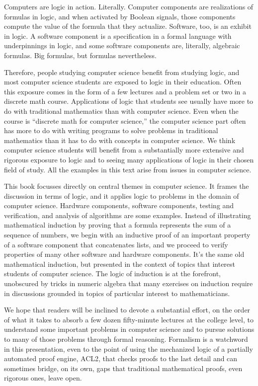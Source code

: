 \begin{preface}
Computers are logic in action. Literally.
Computer components are realizations of formulas in logic,
and when activated by Boolean signals, those components
compute the value of the formula that they actualize.
Software, too, is an exhibit in logic.
A software component is a specification in a formal language
with underpinnings in logic,
and some software components
are, literally, algebraic formulas.
Big formulas, but formulas nevertheless.

Therefore, people studying computer science
benefit from studying logic, and
most computer science students
are exposed to logic in their education.
Often this exposure comes
in the form of a few lectures and a problem set or two
in a discrete math course. Applications of logic that
students see usually have more to do with traditional mathematics
than with computer science. Even when the course
is ``discrete math for computer science,'' the computer science
part often has more to do with writing programs to solve problems
in traditional mathematics than it has to do with
concepts in computer science.
We think computer science students will
benefit from a substantially more extensive and rigorous
exposure to logic and to seeing many applications of
logic in their chosen field of study.
All the examples in this text arise from issues in computer science.

This book focusses directly on central themes
in computer science.
It frames the discussion in terms of logic,
and it applies logic to problems in the domain of computer science.
Hardware components, software components,
testing and verification, and analysis of algorithms
are some examples.
Instead of illustrating mathematical induction by proving
that a formula represents the sum of a sequence of numbers,
we begin with an inductive proof of an important property of
a software component that concatenates lists,
and we proceed to verify properties of
many other software and hardware components.
It's the same old mathematical induction, but presented
in the context of topics that interest
students of computer science.
The logic of induction is at the forefront,
unobscured by tricks in numeric algebra
that many exercises on induction require in
discussions grounded in topics
of particular interest to mathematicians.

We hope that readers will be inclined
to devote a substantial effort, on the order
of what it takes to absorb a few dozen fifty-minute
lectures at the college level,
to understand some important problems in computer science and
to pursue solutions to many of those problems through formal reasoning.
Formalism is a watchword in this presentation, even to the
point of using the mechanized logic of a partially automated proof engine,
ACL2, that checks proofs to the last detail and can sometimes
bridge, on its own, gaps that traditional mathematical
proofs, even rigorous ones, leave open.


\end{preface}
